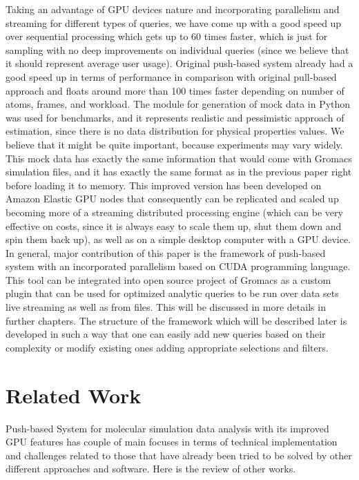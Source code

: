 \documentclass[12pt,letterpaper]{report}
\begin{document}
Taking an advantage of GPU devices nature and incorporating parallelism and streaming for different types of queries, we have come up with a good speed up over sequential processing which gets up to 60 times faster, which is just for sampling with no deep improvements on individual queries (since we believe that it should represent average user usage). Original push-based system already had a good speed up in terms of performance in comparison with original pull-based approach and floats around more than 100 times faster depending on number of atoms, frames, and workload. The module for generation of mock data in Python  was used for benchmarks, and it represents realistic and pessimistic approach of estimation, since there is no data distribution for physical properties values. We believe that it might be quite important, because experiments may vary widely. This mock data has exactly the same information that would come with Gromacs simulation files, and it has exactly the same format as in the previous paper \cite{mainPaper} right before loading it to memory. This improved version has been developed on Amazon Elastic GPU \cite{amazonGPU} nodes that consequently can be replicated and scaled up becoming more of a streaming distributed processing engine (which can be very effective on costs, since it is always easy to scale them up, shut them down and spin them back up), as well as on a simple desktop computer with a GPU device.
In general, major contribution of this paper is the framework of push-based system with an incorporated parallelism based on CUDA programming language. This tool can be integrated into open source project of Gromacs as a custom plugin that can be used for optimized analytic queries to be run over data sets live streaming as well as from files. This will be discussed in more details in further chapters.
The structure of the framework which will be described later is developed in such a way that one can easily add new queries based on their complexity or modify existing ones adding appropriate selections and filters.



\chapter{Related Work}\label{sc:relatedwork}

\hspace{3em} Push-based System for molecular simulation data analysis with its improved GPU features has couple of main focuses in terms of technical implementation and challenges related to those that have already been tried to be solved by other different approaches and software. Here is the review of other works.
\end{document}
